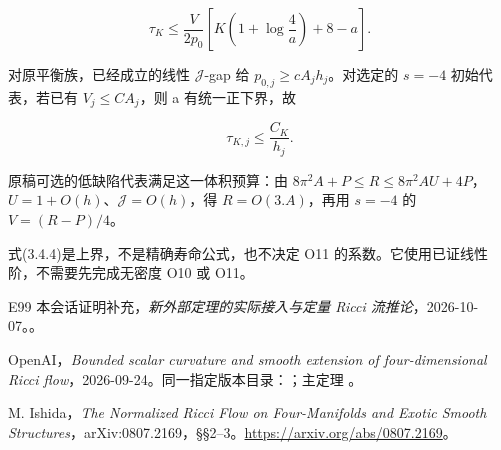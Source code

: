 \documentclass[UTF8,11pt,fontset=none]{ctexart}
\theoremstyle{definition}
\theoremstyle{remark}
\begin{document}
\[
 \boxed{
 \tau_K\le\frac{V}{2p_0}
 \left[K\left(1+\log\frac4a\right)+8-a\right].
 }
\tag{3.4.3}
\]

对原平衡族，已经成立的线性 \(\mathcal J\)-gap 给 \(p_{0,j}\ge cA_jh_j\)。对选定的 \(s=-4\) 初始代表，若已有 \(V_j\le C A_j\)，则 a 有统一正下界，故

\[
 \boxed{\tau_{K,j}\le\frac{C_K}{h_j}.}
\tag{3.4.4}
\]

原稿可选的低缺陷代表满足这一体积预算：由 \(8\pi^2A+P\le R\le8\pi^2AU+4P\)， \(U=1+O(h)\)、\(\mathcal J=O(h)\)，得 \(R=O(3.A)\)，再用 \(s=-4\) 的 \(V=(R-P)/4\)。

式(3.4.4)是上界，不是精确寿命公式，也不决定 O11 的系数。它使用已证线性阶，不需要先完成无密度 O10 或 O11。

\begin{thebibliography}{E99}
\small
{} 本会话证明补充，\emph{新外部定理的实际接入与定量 Ricci 流推论}，2026-10-07。。

 OpenAI，\emph{Bounded scalar curvature and smooth extension of four-dimensional Ricci flow}，2026-09-24。同一指定版本目录：；主定理 。

 M. Ishida，\emph{The Normalized Ricci Flow on Four-Manifolds and Exotic Smooth Structures}，arXiv:0807.2169，§§2--3。\url{https://arxiv.org/abs/0807.2169}。

\end{thebibliography}
\end{document}
